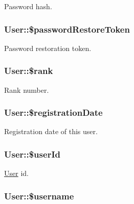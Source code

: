 \label{classUser_a329d5d877d90e34b99c969fd573c8f50}
Password hash. \hypertarget{classUser_a499d31c84301d5ff26c38906c74fab82}{
\subsubsection[{\$passwordRestoreToken}]{\setlength{\rightskip}{0pt plus 5cm}User::\$passwordRestoreToken}}
\label{classUser_a499d31c84301d5ff26c38906c74fab82}
Password restoration token. \hypertarget{classUser_ae9be7cedf59f3dda300308505cfd5948}{
\subsubsection[{\$rank}]{\setlength{\rightskip}{0pt plus 5cm}User::\$rank}}
\label{classUser_ae9be7cedf59f3dda300308505cfd5948}
Rank number. \hypertarget{classUser_a879b23c07bcc1cae216a9ebc2faf3750}{
\subsubsection[{\$registrationDate}]{\setlength{\rightskip}{0pt plus 5cm}User::\$registrationDate}}
\label{classUser_a879b23c07bcc1cae216a9ebc2faf3750}
Registration date of this user. \hypertarget{classUser_abe744027963c3e398da9ad95316ace0d}{
\subsubsection[{\$userId}]{\setlength{\rightskip}{0pt plus 5cm}User::\$userId}}
\label{classUser_abe744027963c3e398da9ad95316ace0d}
\hyperlink{classUser}{User} id. \hypertarget{classUser_ad22e19a56691cba5dc54ac38a91b79ff}{
\subsubsection[{\$username}]{\setlength{\rightskip}{0pt plus 5cm}User::\$username}}
